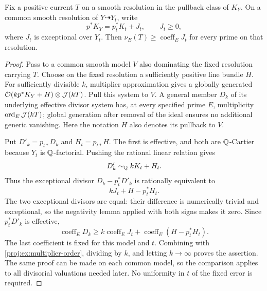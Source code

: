 \begin{lemma}\label{proj:ex:current-comparison}
Fix a positive current \(T\) on a smooth resolution in the
pullback class of \(K_Y\). On a common smooth resolution of
\(Y\dashrightarrow Y_t\), write
\[
 p^*K_Y=p_t^*K_t+J_t,\qquad J_t\geq0,
\]
where \(J_t\) is exceptional over \(Y_t\).
Then \(\nu_E(T)\geq\operatorname{coeff}_E J_t\) for every
prime on that resolution.
\end{lemma}
\begin{proof}
Pass to a common smooth model \(V\) also dominating the
fixed resolution carrying \(T\). Choose on the fixed
resolution a sufficiently positive line bundle \(H\).
For sufficiently divisible \(k\), multiplier approximation
gives a globally generated
\(\mathcal{O}(kp^*K_Y+H)\otimes\mathcal J(kT)\).
Pull this system to \(V\). A general member \(D_k\) of its
underlying effective divisor system has, at every specified
prime \(E\), multiplicity
\(\operatorname{ord}_E\mathcal J(kT)\); global generation after removal
of the ideal ensures no additional generic vanishing.
Here the notation \(H\) also denotes its pullback to \(V\).

Put \(D'_k=p_{t*}D_k\) and \(H_t=p_{t*}H\). The first is
effective, and both are \(\mathbb{Q}\)-Cartier because \(Y_t\) is
\(\mathbb{Q}\)-factorial. Pushing the rational linear relation gives
\[
 D'_k\sim_{\mathbb{Q}} kK_t+H_t.
\]
Thus the exceptional divisor
\(D_k-p_t^*D'_k\) is rationally equivalent to
\[
 kJ_t+H-p_t^*H_t.
\]
The two exceptional divisors are equal: their difference is
numerically trivial and exceptional, so the negativity lemma
applied with both signs makes it zero. Since
\(p_t^*D'_k\) is effective,
\[
 \operatorname{coeff}_E D_k
 \geq k\operatorname{coeff}_E J_t
       +\operatorname{coeff}_E(H-p_t^*H_t).
 \]
The last coefficient is fixed for this model and \(t\).
Combining with \eqref{proj:ex:multiplier-order}, dividing by
\(k\), and letting \(k\to\infty\) proves the assertion.
The same proof can be made on each common model, so the
comparison applies to all divisorial valuations needed
later. No uniformity in \(t\) of the fixed error is required.
\end{proof}

